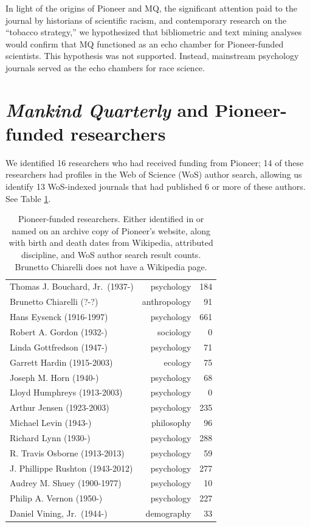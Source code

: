 \documentclass[12pt]{article}
\begin{document}
In light of the origins of Pioneer and MQ, the significant attention paid to the journal by historians of scientific racism, and contemporary research on the ``tobacco strategy,'' we hypothesized that bibliometric and text mining analyses would confirm that MQ functioned as an echo chamber for Pioneer-funded scientists. This hypothesis was not supported. Instead, mainstream psychology journals served as the echo chambers for race science.

\hypertarget{mankind-quarterly-and-pioneer-funded-researchers}{%
\section*{\texorpdfstring{\emph{Mankind Quarterly} and Pioneer-funded researchers}{Mankind Quarterly and Pioneer-funded researchers}}\label{mankind-quarterly-and-pioneer-funded-researchers}}

We identified 16 researchers who had received funding from Pioneer; 14 of these researchers had profiles in the Web of Science (WoS) author search, allowing us identify 13 WoS-indexed journals that had published 6 or more of these authors. See Table \ref{tab:researchers}.

\begin{longtable}[]{@{}lrr@{}}
\caption{\label{tab:researchers} Pioneer-funded researchers. Either identified in \cite{MillerPioneerFundBankrolling1994} or named on an archive copy of Pioneer's website, along with birth and death dates from Wikipedia, attributed discipline, and WoS author search result counts. Brunetto Chiarelli does not have a Wikipedia page.}\tabularnewline
\toprule
\endhead
Thomas J. Bouchard, Jr.~(1937-) & psychology & 184 \\
Brunetto Chiarelli (?-?) & anthropology & 91 \\
Hans Eysenck (1916-1997) & psychology & 661 \\
Robert A. Gordon (1932-) & sociology & 0 \\
Linda Gottfredson (1947-) & psychology & 71 \\
Garrett Hardin (1915-2003) & ecology & 75 \\
Joseph M. Horn (1940-) & psychology & 68 \\
Lloyd Humphreys (1913-2003) & psychology & 0 \\
Arthur Jensen (1923-2003) & psychology & 235 \\
Michael Levin (1943-) & philosophy & 96 \\
Richard Lynn (1930-) & psychology & 288 \\
R. Travis Osborne (1913-2013) & psychology & 59 \\
J. Phillippe Rushton (1943-2012) & psychology & 277 \\
Audrey M. Shuey (1900-1977) & psychology & 10 \\
Philip A. Vernon (1950-) & psychology & 227 \\
Daniel Vining, Jr.~(1944-) & demography & 33 \\
\bottomrule
\end{longtable}
\end{document}
